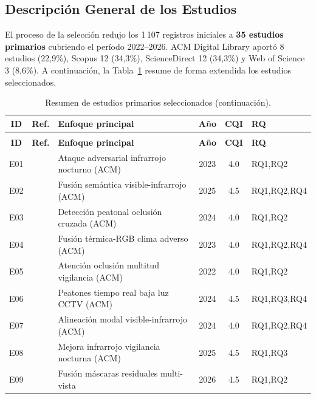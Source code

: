 \documentclass[12pt, a4paper]{article}
\begin{document}
\subsection{Descripci\'{o}n General de los Estudios}

El proceso de la selecci\'{o}n redujo los 1\,107 registros iniciales a
\textbf{35 estudios primarios} cubriendo el per\'{i}odo 2022--2026.
ACM Digital Library aport\'{o} 8 estudios (22{,}9\%), Scopus 12
(34{,}3\%), ScienceDirect 12 (34{,}3\%) y Web of Science 3 (8{,}6\%).
A continuaci\'{o}n, la Tabla~\ref{tab:estudios} resume de forma extendida los estudios seleccionados.

\begin{singlespace}
\small
\begin{longtable}{clp{7.5cm}ccl}
\caption{Resumen de estudios primarios seleccionados.} \label{tab:estudios} \\
\toprule
\textbf{ID} & \textbf{Ref.} & \textbf{Enfoque principal} & \textbf{A\~{n}o} & \textbf{CQI} & \textbf{RQ} \\
\midrule
\endfirsthead
\caption[]{Resumen de estudios primarios seleccionados (continuaci\'{o}n).} \\
\toprule
\textbf{ID} & \textbf{Ref.} & \textbf{Enfoque principal} & \textbf{A\~{n}o} & \textbf{CQI} & \textbf{RQ} \\
\midrule
\endhead
\midrule
\endfoot
\bottomrule
\endlastfoot
E01 & \cite{E01} & Ataque adversarial infrarrojo nocturno (ACM) & 2023 & 4.0 & RQ1,RQ2 \\
E02 & \cite{E02} & Fusi\'{o}n sem\'{a}ntica visible-infrarrojo (ACM) & 2025 & 4.5 & RQ1,RQ2,RQ4 \\
E03 & \cite{E03} & Detecci\'{o}n peatonal oclusi\'{o}n cruzada (ACM) & 2024 & 4.0 & RQ1,RQ2 \\
E04 & \cite{E04} & Fusi\'{o}n t\'{e}rmica-RGB clima adverso (ACM) & 2023 & 4.0 & RQ1,RQ2,RQ4 \\
E05 & \cite{E05} & Atenci\'{o}n oclusi\'{o}n multitud vigilancia (ACM) & 2022 & 4.0 & RQ1,RQ2 \\
E06 & \cite{E06} & Peatones tiempo real baja luz CCTV (ACM) & 2024 & 4.5 & RQ1,RQ3,RQ4 \\
E07 & \cite{E07} & Alineaci\'{o}n modal visible-infrarrojo (ACM) & 2024 & 4.0 & RQ1,RQ2,RQ4 \\
E08 & \cite{E08} & Mejora infrarrojo vigilancia nocturna (ACM) & 2025 & 4.5 & RQ1,RQ3 \\
E09 & \cite{E09} & Fusi\'{o}n m\'{a}scaras residuales multi-vista & 2026 & 4.5 & RQ1,RQ2 \\

\end{longtable}
\end{singlespace}
\end{document}

